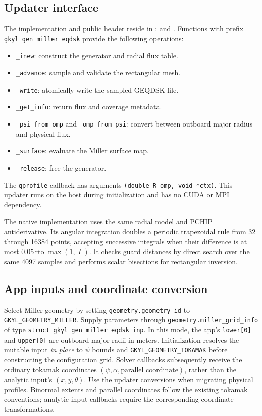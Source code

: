 \documentclass[11pt]{article}
\begin{document}
\subsection{Updater interface}
The implementation and public header reside in :
 and . Functions with prefix
\texttt{gkyl\_gen\_miller\_eqdsk} provide the following operations:
\begin{itemize}
\item \texttt{\_inew}: construct the generator and radial flux table.
\item \texttt{\_advance}: sample and validate the rectangular mesh.
\item \texttt{\_write}: atomically write the sampled GEQDSK file.
\item \texttt{\_get\_info}: return flux and coverage metadata.
\item \texttt{\_psi\_from\_omp} and \texttt{\_omp\_from\_psi}: convert
  between outboard major radius and physical flux.
\item \texttt{\_surface}: evaluate the Miller surface map.
\item \texttt{\_release}: free the generator.
\end{itemize}
The \texttt{qprofile} callback has arguments
\texttt{(double R\_omp, void *ctx)}. This updater runs on the host during
initialization and has no CUDA or MPI dependency.

The native implementation uses the same radial model and PCHIP antiderivative.
Its angular integration doubles a periodic trapezoidal rule from 32 through
16384 points, accepting successive integrals when their difference is at most
$0.05\,\mathrm{rtol}\max(1,|I|)$. It checks guard distances by direct search over
the same 4097 samples and performs scalar bisections for rectangular inversion.

\subsection{App inputs and coordinate conversion}
Select Miller geometry by setting \texttt{geometry.geometry\_id}
to \texttt{GKYL\_GEOMETRY\_MILLER}. Supply parameters through
\texttt{geometry.miller\_grid\_info} of type
\texttt{struct gkyl\_gen\_miller\_eqdsk\_inp}. In this mode, the app's
\texttt{lower[0]} and \texttt{upper[0]} are outboard major radii in meters.
Initialization resolves the mutable input \emph{in place} to $\psi$ bounds
and \texttt{GKYL\_GEOMETRY\_TOKAMAK} before constructing the configuration grid.
Solver callbacks subsequently receive the ordinary tokamak coordinates
$(\psi,\alpha,\text{parallel coordinate})$, rather than the analytic input's
$(x,y,\theta)$. Use the updater conversions when migrating physical profiles.
Binormal extents and parallel coordinates follow the existing tokamak
conventions; analytic-input callbacks require the corresponding coordinate
transformations.
\end{document}
